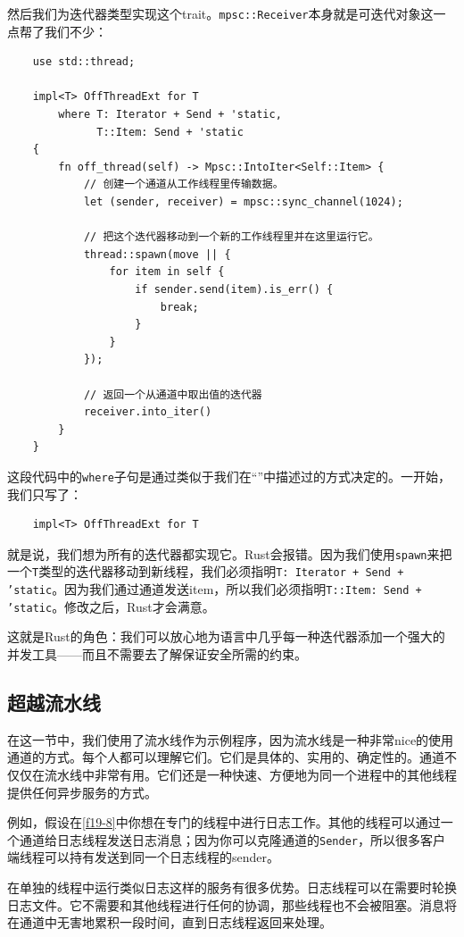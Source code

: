 然后我们为迭代器类型实现这个trait。\texttt{mpsc::Receiver}本身就是可迭代对象这一点帮了我们不少：
\begin{verbatim}
    use std::thread;

    impl<T> OffThreadExt for T
        where T: Iterator + Send + 'static,
              T::Item: Send + 'static
    {
        fn off_thread(self) -> Mpsc::IntoIter<Self::Item> {
            // 创建一个通道从工作线程里传输数据。
            let (sender, receiver) = mpsc::sync_channel(1024);

            // 把这个迭代器移动到一个新的工作线程里并在这里运行它。
            thread::spawn(move || {
                for item in self {
                    if sender.send(item).is_err() {
                        break;
                    }
                }
            });

            // 返回一个从通道中取出值的迭代器
            receiver.into_iter()
        }
    }
\end{verbatim}

这段代码中的\texttt{where}子句是通过类似于我们在“”中描述过的方式决定的。一开始，我们只写了：
\begin{verbatim}
    impl<T> OffThreadExt for T
\end{verbatim}

就是说，我们想为所有的迭代器都实现它。Rust会报错。因为我们使用\texttt{spawn}来把一个\texttt{T}类型的迭代器移动到新线程，我们必须指明\texttt{T: Iterator + Send + 'static}。因为我们通过通道发送item，所以我们必须指明\texttt{T::Item: Send + 'static}。修改之后，Rust才会满意。

这就是Rust的角色：我们可以放心地为语言中几乎每一种迭代器添加一个强大的并发工具——而且不需要去了解保证安全所需的约束。

\subsection{超越流水线}
在这一节中，我们使用了流水线作为示例程序，因为流水线是一种非常nice的使用通道的方式。每个人都可以理解它们。它们是具体的、实用的、确定性的。通道不仅仅在流水线中非常有用。它们还是一种快速、方便地为同一个进程中的其他线程提供任何异步服务的方式。

例如，假设在\autoref{f19-8}中你想在专门的线程中进行日志工作。其他的线程可以通过一个通道给日志线程发送日志消息；因为你可以克隆通道的\texttt{Sender}，所以很多客户端线程可以持有发送到同一个日志线程的sender。

在单独的线程中运行类似日志这样的服务有很多优势。日志线程可以在需要时轮换日志文件。它不需要和其他线程进行任何的协调，那些线程也不会被阻塞。消息将在通道中无害地累积一段时间，直到日志线程返回来处理。

